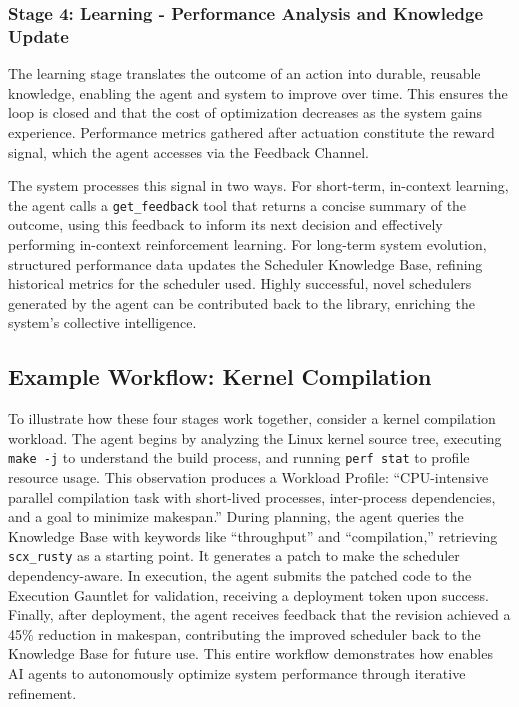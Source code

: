 \subsubsection{Stage 4: Learning - Performance Analysis and Knowledge Update}

The learning stage translates the outcome of an action into durable, reusable knowledge, enabling the agent and system to improve over time. This ensures the loop is closed and that the cost of optimization decreases as the system gains experience. Performance metrics gathered after actuation constitute the reward signal, which the agent accesses via the Feedback Channel.

The system processes this signal in two ways. For short-term, in-context learning, the agent calls a \texttt{get\_feedback} tool that returns a concise summary of the outcome, using this feedback to inform its next decision and effectively performing in-context reinforcement learning. For long-term system evolution, structured performance data updates the Scheduler Knowledge Base, refining historical metrics for the scheduler used. Highly successful, novel schedulers generated by the agent can be contributed back to the library, enriching the system's collective intelligence.


\subsection{Example Workflow: Kernel Compilation}

To illustrate how these four stages work together, consider a kernel compilation workload. The agent begins by analyzing the Linux kernel source tree, executing \texttt{make -j} to understand the build process, and running \texttt{perf stat} to profile resource usage. This observation produces a Workload Profile: ``CPU-intensive parallel compilation task with short-lived processes, inter-process dependencies, and a goal to minimize makespan.'' During planning, the agent queries the Knowledge Base with keywords like ``throughput'' and ``compilation,'' retrieving \texttt{scx\_rusty} as a starting point. It generates a patch to make the scheduler dependency-aware. In execution, the agent submits the patched code to the Execution Gauntlet for validation, receiving a deployment token upon success. Finally, after deployment, the agent receives feedback that the revision achieved a 45\% reduction in makespan, contributing the improved scheduler back to the Knowledge Base for future use. This entire workflow demonstrates how \sys enables AI agents to autonomously optimize system performance through iterative refinement.


